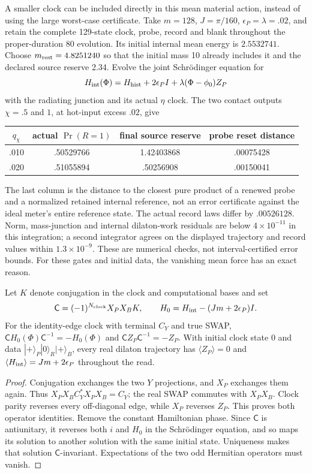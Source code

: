 A smaller clock can be included directly in this mean material action,
instead of using the large worst-case certificate. Take $m=128$,
$J=\pi/160$, $\epsilon_P=\lambda=.02$, and retain the complete
129-state clock, probe, record and blank throughout the proper-duration
80 evolution. Its initial internal mean energy is $2.5532741$.
Choose $m_{\rm rest}=4.8251240$ so that the initial mass 10 already
includes it and the declared source reserve 2.34. Evolve the joint
Schr\"odinger equation for
\[
 H_{\rm int}(\Phi)=H_{\rm hist}+2\epsilon_P I
                       +\lambda(\Phi-\phi_0)Z_P
\]
with the radiating junction and its actual $\eta$ clock. The two contact
outputs $\chi=.5$ and $1$, at hot-input excess $.02$, give
\begin{center}
\begin{tabular}{cccc}
\hline
$q_\chi$ & actual $\Pr(R=1)$ & final source reserve & probe reset distance\\
\hline
.010 & .50529766 & 1.42403868 & .00075428\\
.020 & .51055894 & .50256908 & .00150041\\
\hline
\end{tabular}
\end{center}
The last column is the distance to the closest pure product of a
renewed probe and a normalized retained internal reference, not an error
certificate against the ideal meter's entire reference state. The actual record
laws differ by $.00526128$. Norm, mass-junction and internal dilaton-work
residuals are below $4\times10^{-11}$ in this integration; a second
integrator agrees on the displayed trajectory and record values within
$1.3\times10^{-9}$. These are numerical checks, not interval-certified
error bounds. For these gates and initial data, the vanishing mean force
has an exact reason.

\begin{proposition}
\label{prop:force-neutral-meter}
Let $K$ denote conjugation in the clock and computational bases and set
\[
 \mathsf C=(-1)^{N_{\rm clock}}X_PX_B K,\qquad
 H_0=H_{\rm int}-(Jm+2\epsilon_P)I.
\]
For the identity-edge clock with terminal $C_Y$ and true SWAP,
$\mathsf C H_0(\Phi)\mathsf C^{-1}=-H_0(\Phi)$ and
$\mathsf C Z_P\mathsf C^{-1}=-Z_P$.
With initial clock state $0$ and data $|+\rangle_P|0\rangle_R|+\rangle_B$,
every real dilaton trajectory has
$\langle Z_P\rangle=0$ and
$\langle H_{\rm int}\rangle=Jm+2\epsilon_P$ throughout the read.
\end{proposition}
\begin{proof}
Conjugation exchanges the two $Y$ projections, and $X_P$ exchanges
them again. Thus $X_PX_B C_Y^*X_PX_B=C_Y$; the real SWAP commutes
with $X_PX_B$. Clock parity reverses every off-diagonal edge, while
$X_P$ reverses $Z_P$. This proves both operator identities.
Remove the constant Hamiltonian phase. Since $\mathsf C$ is
antiunitary, it reverses both $i$ and $H_0$ in the Schr\"odinger
equation, and so maps its solution to another solution with the same
initial state. Uniqueness makes that solution $\mathsf C$-invariant.
Expectations of the two odd Hermitian operators must vanish.
\end{proof}

